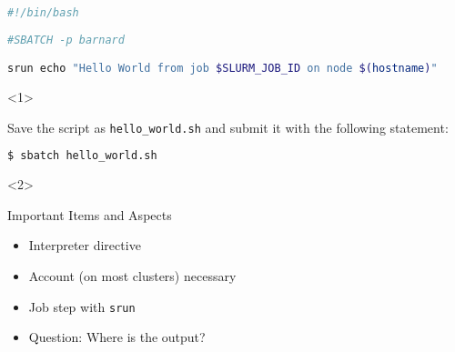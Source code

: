 \begin{frame}[fragile]
	\setcounter{handson}{\value{preframe_handson}}
	\frametitle{}
	\vspace{-2em}
	\begin{minipage}[t][0.32\textheight][t]{1.0\linewidth}
		\begin{lstlisting}[language=Bash, style=Shell, basicstyle=\scriptsize]
#!/bin/bash
			
#SBATCH -p barnard

srun echo "Hello World from job $SLURM_JOB_ID on node $(hostname)"
		\end{lstlisting}
	\end{minipage}\newline
	\begin{minipage}[t][0.3\textheight][t]{1.0\linewidth}
		\begin{onlyenv}<1>
			\begin{task}
				Save the script as \texttt{hello\_world.sh} and submit it with the following statement:
			\end{task}
			\begin{lstlisting}[language=Bash, style=Shell, basicstyle=\footnotesize]
$ sbatch hello_world.sh
			\end{lstlisting}
		\end{onlyenv}
		\begin{onlyenv}<2>
			\begin{block}{Important Items and Aspects}
				\begin{itemize}
					\item Interpreter directive
                                        \item Account (on most clusters) necessary
					\item Job step with \texttt{srun}
					\item Question: Where is the output?
				\end{itemize}
			\end{block}
		\end{onlyenv}
	\end{minipage}
	\vfill
\end{frame}
